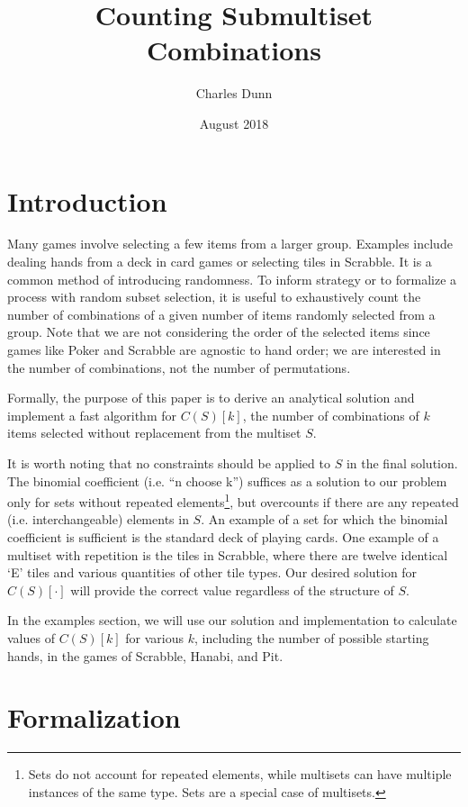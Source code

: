 \documentclass{article}
\title{Counting Submultiset Combinations}
\author{Charles Dunn}
\date{August 2018}
\begin{document}
\maketitle

\section{Introduction}

Many games involve selecting a few items from a larger group. Examples include dealing hands from a deck in card games or selecting tiles in Scrabble. It is a common method of introducing randomness. To inform strategy or to formalize a process with random subset selection, it is useful to exhaustively count the number of combinations of a given number of items randomly selected from a group. Note that we are not considering the order of the selected items since games like Poker and Scrabble are agnostic to hand order; we are interested in the number of combinations, not the number of permutations.

Formally, the purpose of this paper is to derive an analytical solution and implement a fast algorithm for $C(S)[k]$, the number of combinations of $k$ items selected without replacement from the multiset $S$.

It is worth noting that no constraints should be applied to $S$ in the final solution. The binomial coefficient (i.e. ``n choose k'') suffices as a solution to our problem only for sets without repeated elements\footnote{Sets do not account for repeated elements, while multisets can have multiple instances of the same type. Sets are a special case of multisets.}, but overcounts if there are any repeated (i.e. interchangeable) elements in $S$. An example of a set for which the binomial coefficient is sufficient is the standard deck of playing cards. One example of a multiset with repetition is the tiles in Scrabble, where there are twelve identical `E' tiles and various quantities of other tile types. Our desired solution for $C(S)[\cdot]$ will provide the correct value regardless of the structure of $S$.

In the examples section, we will use our solution and implementation to calculate values of $C(S)[k]$ for various $k$, including the number of possible starting hands, in the games of Scrabble, Hanabi, and Pit.

\section{Formalization}
\end{document}
